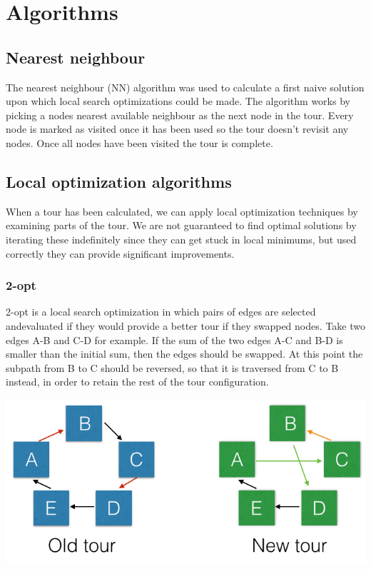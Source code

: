\documentclass[paper=a4, fontsize=11pt,numbers=endperiod]{scrartcl} %
\numberwithin{equation}{section} %
\numberwithin{figure}{section} %
\numberwithin{table}{section} %
\begin{document}
\section{Algorithms}

\subsection{Nearest neighbour}
The nearest neighbour (NN) algorithm was used to calculate a first naive solution upon which local search optimizations could be made.
The algorithm works by picking a nodes nearest available neighbour as the next node in the tour.
Every node is marked as visited once it has been used so the tour doesn't revisit any nodes.
Once all nodes have been visited the tour is complete.

\subsection{Local optimization algorithms}
When a tour has been calculated, we can apply local optimization techniques by examining parts of the tour. We are not guaranteed to find optimal solutions by iterating these indefinitely since they can get stuck in local minimums, but used correctly they can provide significant improvements.

\subsubsection{2-opt}
2-opt is a local search optimization in which pairs of edges are selected andevaluated if they would provide a better tour if they swapped nodes.
Take two edges A-B and C-D for example.
If the sum of the two edges A-C and B-D is smaller than the initial sum, then the edges should be swapped.
At this point the subpath from B to C should be reversed, so that it is traversed from C to B instead, in order to retain the rest of the tour configuration.

\begin{center}
\includegraphics[scale=0.4]{2opt}
\end{center}
\end{document}
